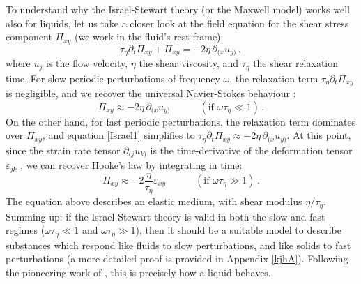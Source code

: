\documentclass[a4paper, amsfonts, amssymb, amsmath, reprint, showkeys, nofootinbib, twoside, onecolumn, notitlepage]{revtex4-1}
\newcommand{\spc}{\quad \quad \quad}
\theoremstyle{definition}
\theoremstyle{theorem}
\begin{document}
To understand why the Israel-Stewart theory (or the Maxwell model) works well also for liquids, let us take a closer look at the field equation for the shear stress component $\Pi_{xy}$ (we work  in the fluid's rest frame):
\begin{equation}\label{Israel1}
\tau_\eta \partial_t \Pi_{xy}+\Pi_{xy} = -2\eta \, \partial_{(x} u_{y)} \, ,
\end{equation}
where $u_j$ is the flow velocity, $\eta$ the shear viscosity, and $\tau_\eta$ the shear relaxation time. For slow periodic perturbations of frequency $\omega$, the relaxation term $\tau_\eta \partial_t \Pi_{xy}$ is negligible, and we recover the universal Navier-Stokes behaviour \cite{LindblomRelaxation1996}:
\begin{equation}\label{pixyvisc}
\Pi_{xy} \approx -2\eta \, \partial_{(x} u_{y)} \spc (\text{if }\omega\tau_\eta \ll 1) \, .
\end{equation}
On the other hand, for fast periodic perturbations, the relaxation term dominates over $\Pi_{xy}$, and equation \eqref{Israel1} simplifies to $\tau_\eta \partial_t\Pi_{xy} \approx -2\eta \, \partial_{(x} u_{y)}$. 
At this point, since the strain rate tensor $\partial_{(j} u_{k)}$ is the time-derivative of the deformation tensor $\varepsilon_{jk}$ \cite{landau7,CarterQuintana1972}, we can recover Hooke's law by integrating in time:
\begin{equation}\label{pixyelast}
\Pi_{xy} \approx -2 \dfrac{\eta}{\tau_\eta }\varepsilon_{xy} \spc (\text{if }\omega\tau_\eta \gg 1) \, .
\end{equation} 
The equation above describes an elastic medium, with shear modulus $\eta/\tau_\eta$. 
Summing up: if the Israel-Stewart theory is valid in both the slow and fast regimes ($\omega\tau_\eta \ll 1$ and $\omega\tau_\eta \gg 1$), then it should be a suitable model to describe substances which respond like fluids to slow perturbations, and like solids to fast perturbations  (a more detailed proof is provided in Appendix \ref{kjhA}). Following the pioneering work of \citet{Frenkel_book}, this is precisely how a liquid behaves. 
\end{document}

